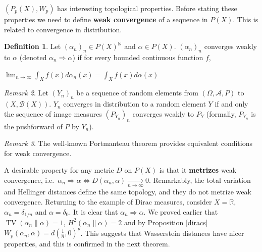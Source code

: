 \documentclass[12pt]{report}
\theoremstyle{definition}
\newtheorem{defi}{Definition}[section]
\theoremstyle{remark}
\newtheorem{rem}[defi]{Remark}
\DeclareMathOperator{\tv}{TV}
\begin{document}
$(P_p(X), W_p)$ has interesting topological properties. Before stating these properties we need to define \textbf{weak convergence} of a sequence in $P(X)$. This is related to convergence in distribution.

\begin{defi}
	Let $(\alpha_n)_n\in P(X)^{\mathbb N}$ and $\alpha \in P(X)$. $(\alpha_n)_n$ converges weakly to $\alpha$ (denoted $\alpha_n \Rightarrow \alpha$) if for every bounded continuous function $f$, \begin{center}$\displaystyle \lim_{n\to \infty} \int_X f(x) d\alpha_n(x) = \int_X f(x) d\alpha(x)$ \end{center}
\end{defi}

\begin{rem}
	Let $(Y_n)_n$ be a sequence of random elements from $(\Omega,\mathcal A,P)$ to $(X,\mathcal B(X))$. $Y_n$ converges in distribution to a random element $Y$ if and only the sequence of image measures $(P_{Y_n})_n$ converges weakly to $P_Y$ (formally, $P_{Y_n}$ is the pushforward of $P$ by $Y_n$). 
\end{rem}

\begin{rem}
	The well-known Portmanteau theorem \cite[Theorem~13.16]{klenke2013probability} provides equivalent conditions for weak convergence.
\end{rem}

A desirable property for any metric $D$ on $P(X)$ is that it \textbf{metrizes} weak convergence, i.e.\ $\alpha_n \Rightarrow \alpha \iff D(\alpha_n, \alpha) \xrightarrow[n\to \infty]{} 0$. Remarkably, the total variation and Hellinger distances define the same topology, and they do not metrize weak convergence. Returning to the example of Dirac measures, consider $X=\mathbb R$, $\alpha_n=\delta_{1/n}$ and $\alpha=\delta_0$. It is clear that $\alpha_n \Rightarrow \alpha$. We proved earlier that $\tv(\alpha_n\|\alpha)=1$, $H^2(\alpha_n\| \alpha)=2$ and by Proposition \ref{diracs} $W_p(\alpha_n,\alpha)=d(\frac 1n, 0)^p$. This suggests that Wasserstein distances have nicer properties, and this is confirmed in the next theorem.
\end{document}
